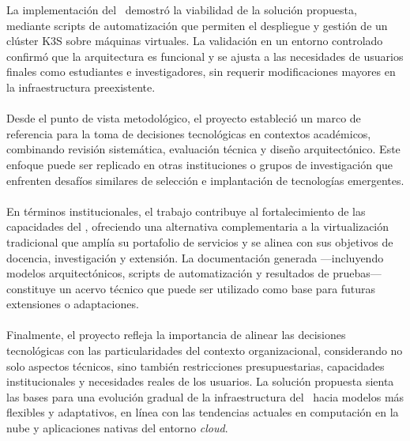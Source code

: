 \noindent
La implementación del \PMV\ demostró la viabilidad de la solución propuesta, mediante scripts de automatización que permiten el despliegue y gestión de un clúster K3S sobre máquinas virtuales. La validación en un entorno controlado confirmó que la arquitectura es funcional y se ajusta a las necesidades de usuarios finales como estudiantes e investigadores, sin requerir modificaciones mayores en la infraestructura preexistente.\\ \\
\noindent
Desde el punto de vista metodológico, el proyecto estableció un marco de referencia para la toma de decisiones tecnológicas en contextos académicos, combinando revisión sistemática, evaluación técnica y diseño arquitectónico. Este enfoque puede ser replicado en otras instituciones o grupos de investigación que enfrenten desafíos similares de selección e implantación de tecnologías emergentes.\\ \\
\noindent
En términos institucionales, el trabajo contribuye al fortalecimiento de las capacidades del \GRID, ofreciendo una alternativa complementaria a la virtualización tradicional que amplía su portafolio de servicios y se alinea con sus objetivos de docencia, investigación y extensión. La documentación generada —incluyendo modelos arquitectónicos, scripts de automatización y resultados de pruebas— constituye un acervo técnico que puede ser utilizado como base para futuras extensiones o adaptaciones.\\ \\
\noindent
Finalmente, el proyecto refleja la importancia de alinear las decisiones tecnológicas con las particularidades del contexto organizacional, considerando no solo aspectos técnicos, sino también restricciones presupuestarias, capacidades institucionales y necesidades reales de los usuarios. La solución propuesta sienta las bases para una evolución gradual de la infraestructura del \GRID\ hacia modelos más flexibles y adaptativos, en línea con las tendencias actuales en computación en la nube y aplicaciones nativas del entorno \textit{cloud}.